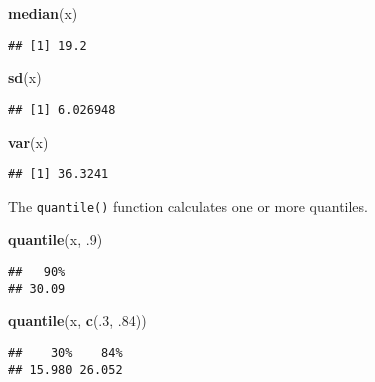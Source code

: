 \documentclass[]{book}
\newenvironment{Shaded}{\begin{snugshade}}{\end{snugshade}}
\newcommand{\KeywordTok}[1]{\textcolor[rgb]{0.13,0.29,0.53}{\textbf{{#1}}}}
\newcommand{\DecValTok}[1]{\textcolor[rgb]{0.00,0.00,0.81}{{#1}}}
\newcommand{\NormalTok}[1]{{#1}}
\begin{document}
\begin{Shaded}
\begin{Highlighting}[]
\KeywordTok{median}\NormalTok{(x)}
\end{Highlighting}
\end{Shaded}

\begin{verbatim}
## [1] 19.2
\end{verbatim}

\begin{Shaded}
\begin{Highlighting}[]
\KeywordTok{sd}\NormalTok{(x)  }
\end{Highlighting}
\end{Shaded}

\begin{verbatim}
## [1] 6.026948
\end{verbatim}

\begin{Shaded}
\begin{Highlighting}[]
\KeywordTok{var}\NormalTok{(x)}
\end{Highlighting}
\end{Shaded}

\begin{verbatim}
## [1] 36.3241
\end{verbatim}

The \texttt{quantile()} function calculates one or more quantiles.

\begin{Shaded}
\begin{Highlighting}[]
\KeywordTok{quantile}\NormalTok{(x, .}\DecValTok{9}\NormalTok{) }
\end{Highlighting}
\end{Shaded}

\begin{verbatim}
##   90% 
## 30.09
\end{verbatim}

\begin{Shaded}
\begin{Highlighting}[]
\KeywordTok{quantile}\NormalTok{(x, }\KeywordTok{c}\NormalTok{(.}\DecValTok{3}\NormalTok{, .}\DecValTok{84}\NormalTok{))}
\end{Highlighting}
\end{Shaded}

\begin{verbatim}
##    30%    84% 
## 15.980 26.052
\end{verbatim}
\end{document}
